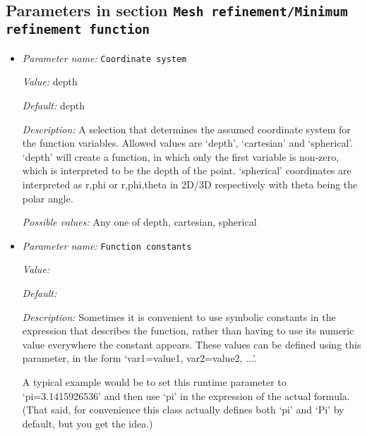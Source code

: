 \subsection{Parameters in section \tt Mesh refinement/Minimum refinement function}
\label{parameters:Mesh_20refinement/Minimum_20refinement_20function}

\begin{itemize}
\item {\it Parameter name:} {\tt Coordinate system}
\label{parameters:Mesh refinement/Minimum refinement function/Coordinate system}
\label{parameters:Mesh_20refinement/Minimum_20refinement_20function/Coordinate_20system}


{\it Value:} depth


{\it Default:} depth


{\it Description:} A selection that determines the assumed coordinate system for the function variables. Allowed values are `depth', `cartesian' and `spherical'. `depth' will create a function, in which only the first variable is non-zero, which is interpreted to be the depth of the point. `spherical' coordinates are interpreted as r,phi or r,phi,theta in 2D/3D respectively with theta being the polar angle.


{\it Possible values:} Any one of depth, cartesian, spherical
\item {\it Parameter name:} {\tt Function constants}
\label{parameters:Mesh refinement/Minimum refinement function/Function constants}
\label{parameters:Mesh_20refinement/Minimum_20refinement_20function/Function_20constants}


{\it Value:} 


{\it Default:} 


{\it Description:} Sometimes it is convenient to use symbolic constants in the expression that describes the function, rather than having to use its numeric value everywhere the constant appears. These values can be defined using this parameter, in the form `var1=value1, var2=value2, ...'.

A typical example would be to set this runtime parameter to `pi=3.1415926536' and then use `pi' in the expression of the actual formula. (That said, for convenience this class actually defines both `pi' and `Pi' by default, but you get the idea.)



\end{itemize}
